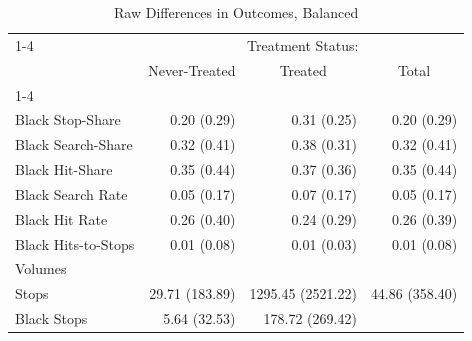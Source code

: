 \begin{table}[!h]
\caption{Raw Differences in Outcomes, Balanced}
\centering
\begin{tabular}{llll}
\cline{1-4}
\multicolumn{1}{r}{} &
  \multicolumn{3}{c}{Treatment Status:} \\
\multicolumn{1}{r}{} &
  \multicolumn{1}{c}{Never-Treated} &
  \multicolumn{1}{c}{Treated} &
  \multicolumn{1}{c}{Total} \\
\cline{1-4}
\multicolumn{1}{l}{Rates} &
  \multicolumn{1}{r}{} &
  \multicolumn{1}{r}{} &
  \multicolumn{1}{r}{} \\
\multicolumn{1}{l}{\hspace{1em}Black Stop-Share} &
  \multicolumn{1}{r}{0.20 (0.29)} &
  \multicolumn{1}{r}{0.31 (0.25)} &
  \multicolumn{1}{r}{0.20 (0.29)} \\
\multicolumn{1}{l}{\hspace{1em}Black Search-Share} &
  \multicolumn{1}{r}{0.32 (0.41)} &
  \multicolumn{1}{r}{0.38 (0.31)} &
  \multicolumn{1}{r}{0.32 (0.41)} \\
\multicolumn{1}{l}{\hspace{1em}Black Hit-Share} &
  \multicolumn{1}{r}{0.35 (0.44)} &
  \multicolumn{1}{r}{0.37 (0.36)} &
  \multicolumn{1}{r}{0.35 (0.44)} \\
\multicolumn{1}{l}{\hspace{1em}Black Search Rate} &
  \multicolumn{1}{r}{0.05 (0.17)} &
  \multicolumn{1}{r}{0.07 (0.17)} &
  \multicolumn{1}{r}{0.05 (0.17)} \\
\multicolumn{1}{l}{\hspace{1em}Black Hit Rate} &
  \multicolumn{1}{r}{0.26 (0.40)} &
  \multicolumn{1}{r}{0.24 (0.29)} &
  \multicolumn{1}{r}{0.26 (0.39)} \\
\multicolumn{1}{l}{\hspace{1em}Black Hits-to-Stops} &
  \multicolumn{1}{r}{0.01 (0.08)} &
  \multicolumn{1}{r}{0.01 (0.03)} &
  \multicolumn{1}{r}{0.01 (0.08)} \\
\multicolumn{1}{l}{Volumes} &
  \multicolumn{1}{r}{} &
  \multicolumn{1}{r}{} &
  \multicolumn{1}{r}{} \\
\multicolumn{1}{l}{\hspace{1em}Stops} &
  \multicolumn{1}{r}{29.71 (183.89)} &
  \multicolumn{1}{r}{1295.45 (2521.22)} &
  \multicolumn{1}{r}{44.86 (358.40)} \\
\multicolumn{1}{l}{\hspace{1em}Black Stops} &
  \multicolumn{1}{r}{5.64 (32.53)} &
  \multicolumn{1}{r}{178.72 (269.42)} &

\end{tabular}
\end{table}
